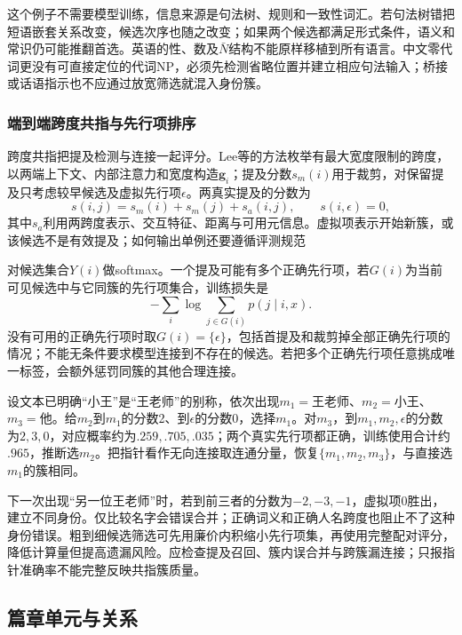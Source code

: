 这个例子不需要模型训练，信息来源是句法树、规则和一致性词汇。若句法树错把短语嵌套关系改变，候选次序也随之改变；如果两个候选都满足形式条件，语义和常识仍可能推翻首选。英语的性、数及$\bar N$结构不能原样移植到所有语言。中文零代词更没有可直接定位的代词NP，必须先检测省略位置并建立相应句法输入；桥接或话语指示也不应通过放宽筛选就混入身份簇。

\subsubsection{端到端跨度共指与先行项排序}
\label{sec:nlp-analysis-span-coreference}

跨度共指把提及检测与连接一起评分。Lee等的方法枚举有最大宽度限制的跨度，以两端上下文、内部注意力和宽度构造$\bm g_i$；提及分数$s_m(i)$用于裁剪，对保留提及只考虑较早候选及虚拟先行项$\epsilon$。两真实提及的分数为
\[
 s(i,j)=s_m(i)+s_m(j)+s_a(i,j),\qquad s(i,\epsilon)=0,
\]
其中$s_a$利用两跨度表示、交互特征、距离与可用元信息。虚拟项表示开始新簇，或该候选不是有效提及；如何输出单例还要遵循评测规范

对候选集合$Y(i)$做softmax。一个提及可能有多个正确先行项，若$G(i)$为当前可见候选中与它同簇的先行项集合，训练损失是
\begin{equation}
 -\sum_i\log\sum_{j\in G(i)}p(j\mid i,x).
 \label{eq:nlp-analysis-coreference-marginal}
\end{equation}
没有可用的正确先行项时取$G(i)=\{\epsilon\}$，包括首提及和裁剪掉全部正确先行项的情况；不能无条件要求模型连接到不存在的候选。若把多个正确先行项任意挑成唯一标签，会额外惩罚同簇的其他合理连接。

设文本已明确“小王”是“王老师”的别称，依次出现$m_1=\text{王老师}$、$m_2=\text{小王}$、$m_3=\text{他}$。给$m_2$到$m_1$的分数2、到$\epsilon$的分数0，选择$m_1$。对$m_3$，到$m_1,m_2,\epsilon$的分数为$2,3,0$，对应概率约为$.259,.705,.035$；两个真实先行项都正确，训练使用合计约$.965$，推断选$m_2$。把指针看作无向连接取连通分量，恢复$\{m_1,m_2,m_3\}$，与直接选$m_1$的簇相同。

下一次出现“另一位王老师”时，若到前三者的分数为$-2,-3,-1$，虚拟项0胜出，建立不同身份。仅比较名字会错误合并；正确词义和正确人名跨度也阻止不了这种身份错误。粗到细候选筛选可先用廉价内积缩小先行项集，再使用完整配对评分，降低计算量但提高遗漏风险。应检查提及召回、簇内误合并与跨簇漏连接；只报指针准确率不能完整反映共指簇质量。

\subsection{篇章单元与关系}
\label{sec:nlp-analysis-discourse-relations}


